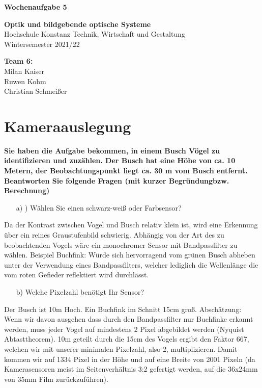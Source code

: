 \documentclass[a4paper]{article}
\begin{document}
	\thispagestyle{empty}
	
	\begin{center}\strut
		\bfseries\Huge
		Wochenaufgabe 5
	\end{center}
	\vfill
	
	\begin{center}\strut
		\textbf{Optik und bildgebende optische Systeme}\\
		Hochschule Konstanz Technik, Wirtschaft und Gestaltung\\
		Wintersemester 2021/22
	\end{center}
	
	\begin{center}\strut
		\textbf{Team 6:}\\
		Milan Kaiser\\
		Ruwen Kohm\\
		Christian Schmeißer\\
	\end{center}
	\vfill
	\vfill

	\clearpage
	\newpage
	
	\section{Kameraauslegung}
	\textbf{Sie haben die Aufgabe bekommen, in einem Busch Vögel zu identifizieren und zuzählen. Der Busch hat
		eine Höhe von ca. 10 Metern, der Beobachtungspunkt liegt ca. 30 m vom Busch entfernt. Beantworten
		Sie folgende Fragen (mit kurzer Begründungbzw. Berechnung)}\\
	
	\begin{itemize}
		\item[a)]) Wählen Sie einen schwarz-weiß oder Farbsensor?
	\end{itemize}
	Da der Kontrast zwischen Vogel und Busch relativ klein ist, wird eine Erkennung über ein reines Graustufenbild schwierig. Abhängig von der Art des zu beobachtenden Vogels wäre ein monochromer Sensor mit Bandpassfilter zu wählen. Beispiel Buchfink: Würde sich hervorragend vom grünen Busch abheben unter der Verwendung eines Bandpassfilters, welcher lediglich die Wellenlänge die vom roten Gefieder reflektiert wird durchlässt.\\
	\begin{itemize}
	\item[b)] Welche Pixelzahl benötigt Ihr Sensor?
	\end{itemize}
	Der Busch ist 10m Hoch. Ein Buchfink im Schnitt 15cm groß. Abschätzung: Wenn wir davon ausgehen dass durch den Bandpassfilter nur Buchfinke erkannt werden, muss jeder Vogel auf mindestens 2 Pixel abgebildet werden (Nyquist Abtasttheorem). 10m geteilt durch die 15cm des Vogels ergibt den Faktor 667, welchen wir mit unserer minimalen Pixelzahl, also 2, multiplizieren. Damit kommen wir auf 1334 Pixel in der Höhe und auf eine Breite von 2001 Pixeln (da Kamerasensoren meist im Seitenverhältnis 3:2 gefertigt werden, auf die 36x24mm von 35mm Film zurückzuführen).\\
	
\end{document}
